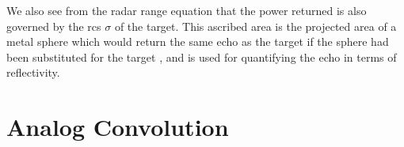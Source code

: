 We also see from the radar range equation that the power returned is also governed by the \gls{rcs} $\sigma$ of the target. This ascribed area is the projected area of a metal sphere which would return the same echo as the target if the sphere had been substituted for the target \citep{skolnik_2009}, and is used for quantifying the echo in terms of reflectivity.  












\section{Analog Convolution}

